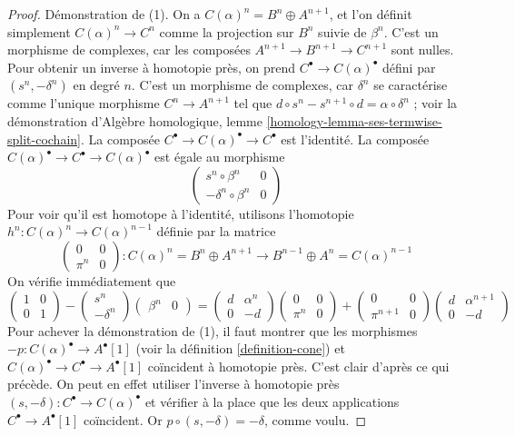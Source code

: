 \begin{proof}
Démonstration de (1). On a $C(\alpha)^n = B^n \oplus A^{n + 1}$, et l'on
définit simplement $C(\alpha)^n \to C^n$ comme la projection sur $B^n$ suivie
de $\beta^n$. C'est un morphisme de complexes, car les composées
$A^{n + 1} \to B^{n + 1} \to C^{n + 1}$ sont nulles.
Pour obtenir un inverse à homotopie près, on prend
$C^\bullet \to C(\alpha)^\bullet$ défini par
$(s^n , -\delta^n)$ en degré $n$. C'est un morphisme de complexes, car $\delta^n$ se
caractérise comme l'unique morphisme $C^n \to A^{n + 1}$ tel que
$d \circ s^n - s^{n + 1} \circ d = \alpha \circ \delta^n$ ; voir la
démonstration d'Algèbre homologique, lemme
\ref{homology-lemma-ses-termwise-split-cochain}.
La composée $C^\bullet \to C(\alpha)^\bullet \to C^\bullet$ est l'identité.
La composée $C(\alpha)^\bullet \to C^\bullet \to C(\alpha)^\bullet$ est égale
au morphisme
$$
\left(
\begin{matrix}
s^n \circ \beta^n & 0 \\
-\delta^n \circ \beta^n & 0
\end{matrix}
\right)
$$
Pour voir qu'il est homotope à l'identité, utilisons l'homotopie
$h^n : C(\alpha)^n \to C(\alpha)^{n - 1}$ définie par la matrice
$$
\left(
\begin{matrix}
0 & 0 \\
\pi^n & 0
\end{matrix}
\right) : C(\alpha)^n = B^n \oplus A^{n + 1} \to
B^{n - 1} \oplus A^n = C(\alpha)^{n - 1}
$$
On vérifie immédiatement que
$$
\left(
\begin{matrix}
1 & 0 \\
0 & 1
\end{matrix}
\right)
-
\left(
\begin{matrix}
s^n \\
-\delta^n
\end{matrix}
\right)
\left(
\begin{matrix}
\beta^n & 0
\end{matrix}
\right)
=
\left(
\begin{matrix}
d & \alpha^n \\
0 & -d
\end{matrix}
\right)
\left(
\begin{matrix}
0 & 0 \\
\pi^n & 0
\end{matrix}
\right)
+
\left(
\begin{matrix}
0 & 0 \\
\pi^{n + 1} & 0
\end{matrix}
\right)
\left(
\begin{matrix}
d & \alpha^{n + 1} \\
0 & -d
\end{matrix}
\right)
$$
Pour achever la démonstration de (1), il faut montrer que les morphismes
$-p : C(\alpha)^\bullet \to A^\bullet[1]$ (voir la
définition \ref{definition-cone}) et
$C(\alpha)^\bullet \to C^\bullet \to A^\bullet[1]$ coïncident à homotopie
près. C'est clair d'après ce qui précède. On peut en effet utiliser l'inverse à
homotopie près $(s, -\delta) : C^\bullet \to C(\alpha)^\bullet$ et vérifier à
la place que les deux applications $C^\bullet \to A^\bullet[1]$ coïncident.
Or $p \circ (s, -\delta) = -\delta$, comme voulu.


\end{proof}

